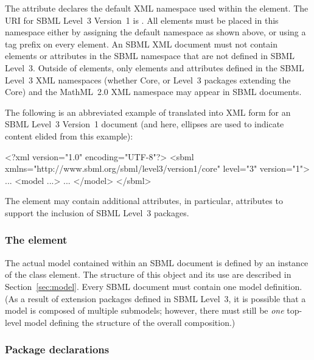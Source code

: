 The attribute  declares the default XML namespace
used within the  element.  The URI for SBML Level~3
Version~1 is .
All elements must be placed in this namespace either by assigning
the default namespace as shown above, or using a tag prefix on
every element.  An SBML XML document must not contain elements or
attributes in the SBML namespace that are not defined in SBML
Level~3.  Outside of  elements, only elements
and attributes defined in the SBML Level~3 XML namespaces (whether
Core, or Level~3 packages extending the Core) and the MathML~2.0
XML namespace may appear in SBML documents.

The following is an abbreviated example of \Sbml translated into
XML form for an SBML Level~3 Version~1 document (and here,
ellipses are used to indicate content elided from this example):

\begin{example}
<?xml version="1.0" encoding="UTF-8"?>
<sbml xmlns="http://www.sbml.org/sbml/level3/version1/core" level="3" version="1">
  ...
  <model ...>
     ...
  </model>
</sbml>
\end{example}

The  element may contain additional attributes, in
particular, attributes to support the inclusion of SBML Level~3
packages.


\subsubsection{The  element}

The actual model contained within an SBML document is defined by
an instance of the \Model class element.  The structure of this
object and its use are described in Section~\ref{sec:model}.
Every SBML document must contain one model definition.  (As a
result of extension packages defined in SBML Level~3, it is
possible that a model is composed of multiple submodels; however,
there must still be \emph{one} top-level model defining the
structure of the overall composition.)


\subsubsection{Package declarations}
\label{sec:sbml-packages}

